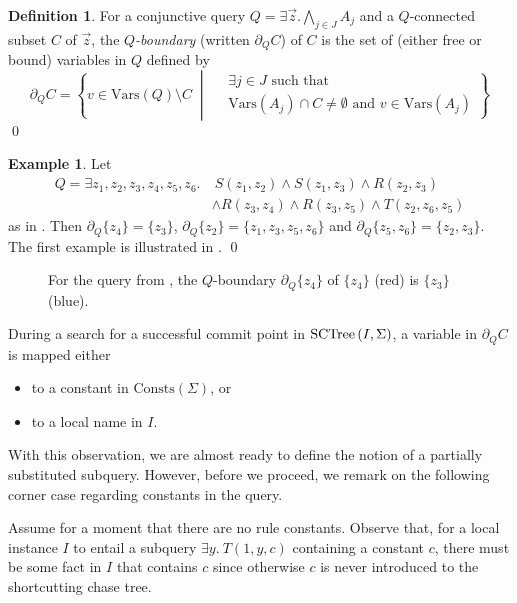 \documentclass[12pt]{report}
\theoremstyle{plain}
\theoremstyle{definition}
\newtheorem{definition}[theorem]{Definition}
\newtheorem{example}[theorem]{Example}
\def\Vars{{\mathrm{Vars}}}
\def\Consts{{\mathrm{Consts}}}
\newcommand{\SCTree}[2]{\ensuremath{\normalfont{\textrm{SCTree}} \left( #1, #2 \right)}}
\begin{document}
\begin{definition}
  For a conjunctive query $Q = \exists \vec{z}. \bigwedge_{j \in J} A_j$ and a $Q$-connected subset $C$ of $\vec{z}$, the \emph{$Q$-boundary} (written $\partial_Q C$) of $C$ is the set of (either free or bound) variables in $Q$ defined by $$
    \partial_Q C = \left\{
      v \in \Vars(Q) \setminus C
        \;\middle|\;
      \begin{aligned}
        & \exists j \in J \text{ such that } \\
        & \Vars(A_j) \cap C \neq \emptyset \text{ and } v \in \Vars(A_j)
      \end{aligned}
    \right\}
  $$
  \qed
\end{definition}

\begin{example}
  Let
  \begin{align*}
    Q = \exists z_1,z_2,z_3,z_4,z_5,z_6.&\ S(z_1, z_2) \wedge S(z_1,z_3) \wedge R(z_2, z_3) \\
    &\wedge R(z_3, z_4) \wedge R(z_3, z_5) \wedge T(z_2, z_6, z_5)
  \end{align*}
  as in . Then $\partial_Q \{z_4\} = \{z_3\}$, $\partial_Q \{z_2\} = \{z_1, z_3, z_5, z_6\}$ and $\partial_Q \{z_5, z_6\} = \{z_2, z_3\}$. The first example is illustrated in .
  \qed
\end{example}

\begin{figure}[h]
  \centering
  
  \caption{For the query from , the $Q$-boundary $\partial_Q \{z_4\}$ of $\{z_4\}$ (red) is $\{z_3\}$ (blue).}
  \label{query-boundary-example}
\end{figure}

During a search for a successful commit point in $\SCTree{I}{\Sigma}$, a variable in $\partial_Q C$ is mapped either
\begin{itemize}
  \item to a constant in $\Consts(\Sigma)$, or
  \item to a local name in $I$.
\end{itemize}

With this observation, we are almost ready to define the notion of a partially substituted subquery. However, before we proceed, we remark on the following corner case regarding constants in the query.

Assume for a moment that there are no rule constants. Observe that, for a local instance $I$ to entail a subquery $\exists y.\ T(1, y, c)$ containing a constant $c$, there must be some fact in $I$ that contains $c$ since otherwise $c$ is never introduced to the shortcutting chase tree.
\end{document}
